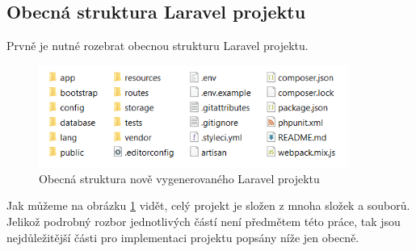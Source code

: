 	\subsection{Obecná struktura Laravel projektu}
	Prvně je nutné rozebrat obecnou strukturu Laravel projektu. 
		\begin{figure}[H]
			\centering %
			\includegraphics[width=0.9\textwidth]{img/laravel_struktura.png} %
			\caption{Obecná struktura nově vygenerovaného Laravel projektu} %
			\label{fig:laravel_str} %
		\end{figure}
	Jak můžeme na obrázku \ref{fig:laravel_str} vidět, celý projekt je složen z mnoha složek a souborů. Jelikož podrobný rozbor jednotlivých částí není předmětem této práce, tak jsou nejdůležitější části pro implementaci projektu popsány níže jen obecně.
